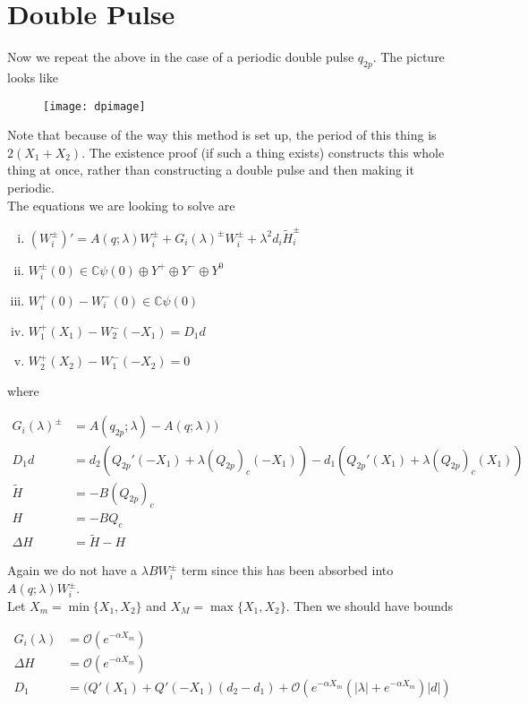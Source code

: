 \documentclass[12pt]{article}
\def\C{{\mathbb C}}
\begin{document}
\section*{Double Pulse}

Now we repeat the above in the case of a periodic double pulse $q_{2p}$. The picture looks like

\begin{figure}[H]
\texttt{[image: dpimage]}
\end{figure}

Note that because of the way this method is set up, the period of this thing is $2(X_1 + X_2)$. The existence proof (if such a thing exists) constructs this whole thing at once, rather than constructing a double pulse and then making it periodic. \\

The equations we are looking to solve are

\begin{enumerate}[(i)]
\item $(W_i^\pm)' = A(q; \lambda) W_i^\pm + G_i(\lambda)^\pm W_i^\pm + \lambda^2 d_i \tilde{H}_i^\pm$
\item $W_i^\pm(0) \in \C \psi(0) \oplus Y^+ \oplus Y^- \oplus Y^0$
\item $W_i^+(0) - W_i^-(0) \in \C \psi(0) $
\item $W_1^+(X_1) - W_2^-(-X_1) = D_1 d $
\item $W_2^+(X_2) - W_1^-(-X_2) = 0$
\end{enumerate}

where

\begin{align*}
G_i(\lambda)^\pm &= A(q_{2p};\lambda) - A(q;\lambda)) \\
D_1 d &= d_2(Q_{2p}'(-X_1) + \lambda (Q_{2p})_c(-X_1)) 
- d_1 ( Q_{2p}'(X_1) + \lambda (Q_{2p})_c(X_1) ) \\
\tilde{H} &= -B(Q_{2p})_c \\
H &= -B Q_c \\
\Delta H &= \tilde{H} - H
\end{align*}

Again we do not have a $\lambda B W_i^\pm$ term since this has been absorbed into $A(q; \lambda) W_i^\pm$. \\

Let $X_m = \min\{ X_1, X_2 \}$ and $X_M = \max\{ X_1, X_2 \}$. Then we should have bounds

\begin{align*}
G_i(\lambda) &= \mathcal{O}(e^{-\alpha X_m}) \\
\Delta H &= \mathcal{O}(e^{-\alpha X_m}) \\
D_1 &= ( Q'(X_1) + Q'(-X_1 )(d_2 - d_1 ) + \mathcal{O} \left( e^{-\alpha X_m} \left( |\lambda| +  e^{-\alpha X_m}  \right) |d| \right)
\end{align*}
\end{document}
